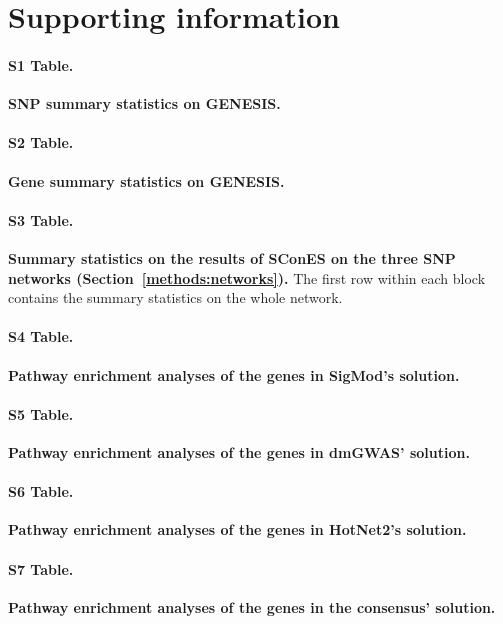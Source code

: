 \documentclass[10pt,letterpaper]{article}
\begin{document}
\section{Supporting information}

\paragraph*{S1 Table.}
\label{stab:snp_summary}
\textbf{SNP summary statistics on GENESIS.}

\paragraph*{S2 Table.}
\label{stab:gene_summary}
\textbf{Gene summary statistics on GENESIS.}

\paragraph*{S3 Table.}
\label{stab:snp_solutions}
\textbf{Summary statistics on the results of SConES on the three SNP networks (Section~\ref{methods:networks}).} The first row within each block contains the summary statistics on the whole network.

\paragraph*{S4 Table.}
\label{stab:sigmod_pwy}
\textbf{Pathway enrichment analyses of the genes in SigMod's solution.}

\paragraph*{S5 Table.}
\label{stab:dmgwas_pwy}
\textbf{Pathway enrichment analyses of the genes in dmGWAS' solution.}

\paragraph*{S6 Table.}
\label{stab:hotnet2_pwy}
\textbf{Pathway enrichment analyses of the genes in HotNet2's solution.}

\paragraph*{S7 Table.}
\label{stab:consensus_pwy}
\textbf{Pathway enrichment analyses of the genes in the consensus' solution.}
\end{document}

